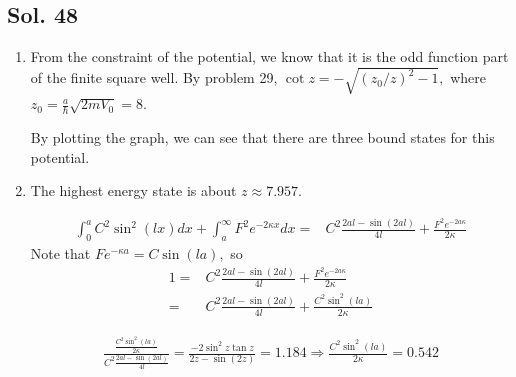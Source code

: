 \subsection*{Sol. 48}
\begin{enumerate}
    \item 
    From the constraint of the potential, we know that it is the odd function part of the finite square well.
    By problem 29, $\cot z = -\sqrt{(z_0/z)^2-1},$ where $z_0=\frac{a}{\hbar}\sqrt{2mV_0}=8.$


    By plotting the graph, we can see that there are three bound states for this potential.

    \item The highest energy state is about $z\approx 7.957.$


    \begin{align*}
        \int^a_0C^2\sin^2(lx)dx + \int_a^\infty F^2e^{-2\kappa x}dx =&
        C^2\frac{2al-\sin(2al)}{4l}+\frac{F^2e^{-2a\kappa}}{2\kappa}
    \end{align*}
    Note that $Fe^{-\kappa a}=C\sin(la),$ so 
    \begin{align*}
        1 =& C^2\frac{2al-\sin(2al)}{4l} + 
        \frac{F^2e^{-2a\kappa}}{2\kappa}\\
        =&C^2\frac{2al-\sin(2al)}{4l}+\frac{C^2\sin^2(la)}{2\kappa}
    \end{align*}

    \begin{align*}
        \frac{\frac{C^2\sin^2(la)}{2\kappa}}{C^2\frac{2al-\sin(2al)}{4l}}
        =\frac{-2\sin^2z\tan z}{2z-\sin(2z)} = 1.184
        \Rightarrow 
        \frac{C^2\sin^2(la)}{2\kappa}=0.542
    \end{align*}

    
\end{enumerate}

